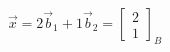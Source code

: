 \documentclass[preview]{standalone}
\begin{document}
\begin{align*}
\vec{x}=2\vec{b}_1+1\vec{b}_2=\begin{bmatrix}2\\1\end{bmatrix}_{B}
\end{align*}
\end{document}
